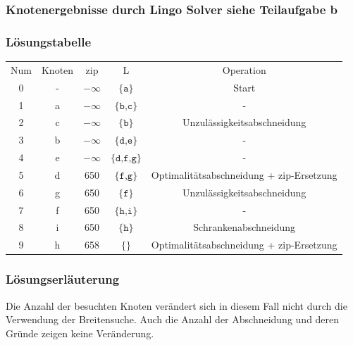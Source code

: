 \documentclass[a4paper,11pt]{article}
\begin{document}
\subsubsection*{Knotenergebnisse durch Lingo Solver siehe Teilaufgabe b}

\subsubsection*{Lösungstabelle}
    \begin{tabular}{ c c c c c }
        Num & Knoten & zip & L & Operation \\
        0 & - & $-\infty$ & $\texttt{\{a\}}$ & Start \\
        1 & a & $-\infty$ & $\texttt{\{b,c\}}$ & - \\
        2 & c & $-\infty$ & $\texttt{\{b\}}$ & Unzulässigkeitsabschneidung \\
        3 & b & $-\infty$ & $\texttt{\{d,e\}}$ & - \\
        4 & e & $-\infty$ & $\texttt{\{d,f,g\}}$ & - \\
        5 & d & 650 & $\texttt{\{f,g\}}$ & Optimalitätsabschneidung + zip-Ersetzung \\
        6 & g & 650 & $\texttt{\{f\}}$ & Unzulässigkeitsabschneidung \\
        7 & f & 650 & $\texttt{\{h,i\}}$ & - \\
        8 & i & 650 & $\texttt{\{h\}}$ & Schrankenabschneidung \\
        9 & h & 658 & $\texttt{\{\}}$ &  Optimalitätsabschneidung + zip-Ersetzung \\
    \end{tabular}

\subsubsection*{Lösungserläuterung}
Die Anzahl der besuchten Knoten verändert sich in diesem Fall nicht durch die Verwendung der Breitensuche. Auch die Anzahl der Abschneidung und deren Gründe zeigen keine Veränderung.
\end{document}
